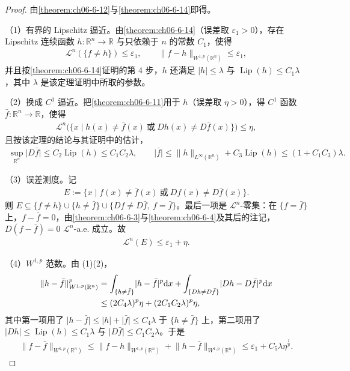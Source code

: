 \documentclass[../../main.tex]{subfiles}%
\begin{document}
\begin{proof}
由\cref{theorem:ch06-6-12}与\cref{theorem:ch06-6-14}即得。%

（1）有界的 Lipschitz 逼近。由\cref{theorem:ch06-6-14}（误差取 $\varepsilon_1>0$），存在 Lipschitz 连续函数 $h:\mathbb{R}^n\to\mathbb{R}$ 与只依赖于 $n$ 的常数 $C_1$，使得%
\begin{align*}
\mathcal{L}^n(\{f\ne h\})\le\varepsilon_1,\qquad\lVert f-h\rVert_{W^{1,p}(\mathbb{R}^n)}\le\varepsilon_1,
\end{align*}
并且按\cref{theorem:ch06-6-14}证明的第 4 步，$h$ 还满足 $\lvert h\rvert\le\lambda$ 与 $\operatorname{Lip}(h)\le C_1\lambda$，其中 $\lambda$ 是该定理证明中所取的参数。%

（2）换成 $C^1$ 逼近。把\cref{theorem:ch06-6-11}用于 $h$（误差取 $\eta>0$），得 $C^1$ 函数 $\bar f:\mathbb{R}^n\to\mathbb{R}$，使得%
\begin{align*}
\mathcal{L}^n\bigl(\{x\mid h(x)\ne\bar f(x)\ \text{或}\ Dh(x)\ne D\bar f(x)\}\bigr)\le\eta,
\end{align*}
且按该定理的结论与其证明中的估计，
\begin{align*}
\sup_{\mathbb{R}^n}\lvert D\bar f\rvert\le C_2\operatorname{Lip}(h)\le C_1C_2\lambda,\qquad\lvert\bar f\rvert\le\lVert h\rVert_{L^{\infty}(\mathbb{R}^n)}+C_3\operatorname{Lip}(h)\le(1+C_1C_3)\lambda .
\end{align*}

（3）误差测度。记
\begin{align*}
E:=\{x\mid f(x)\ne\bar f(x)\ \text{或}\ Df(x)\ne D\bar f(x)\}.
\end{align*}
则 $E\subseteq\{f\ne h\}\cup\{h\ne\bar f\}\cup\{Df\ne D\bar f,\ f=\bar f\}$。最后一项是 $\mathcal{L}^n$-零集：在 $\{f=\bar f\}$ 上，$f-\bar f=0$，由\cref{theorem:ch06-6-3}与\cref{theorem:ch06-6-4}及其后的注记，$D(f-\bar f)=0$ $\mathcal{L}^n$-a.e. 成立。故%
\begin{align*}
\mathcal{L}^n(E)\le\varepsilon_1+\eta .
\end{align*}

（4）$W^{1,p}$ 范数。由 (1)(2)，
\begin{align*}
\lVert h-\bar f\rVert_{W^{1,p}(\mathbb{R}^n)}^p&=\int_{\{h\ne\bar f\}}\lvert h-\bar f\rvert^p\mathrm{d} x+\int_{\{Dh\ne D\bar f\}}\lvert Dh-D\bar f\rvert^p\mathrm{d} x\\
&\le(2C_4\lambda)^p\eta+(2C_1C_2\lambda)^p\eta,
\end{align*}
其中第一项用了 $\lvert h-\bar f\rvert\le\lvert h\rvert+\lvert\bar f\rvert\le C_4\lambda$ 于 $\{h\ne\bar f\}$ 上，第二项用了 $\lvert Dh\rvert\le\operatorname{Lip}(h)\le C_1\lambda$ 与 $\lvert D\bar f\rvert\le C_1C_2\lambda$。于是
\begin{align*}
\lVert f-\bar f\rVert_{W^{1,p}(\mathbb{R}^n)}\le\lVert f-h\rVert_{W^{1,p}(\mathbb{R}^n)}+\lVert h-\bar f\rVert_{W^{1,p}(\mathbb{R}^n)}\le\varepsilon_1+C_5\lambda\eta^{\frac1p}.
\end{align*}


\end{proof}
\end{document}
